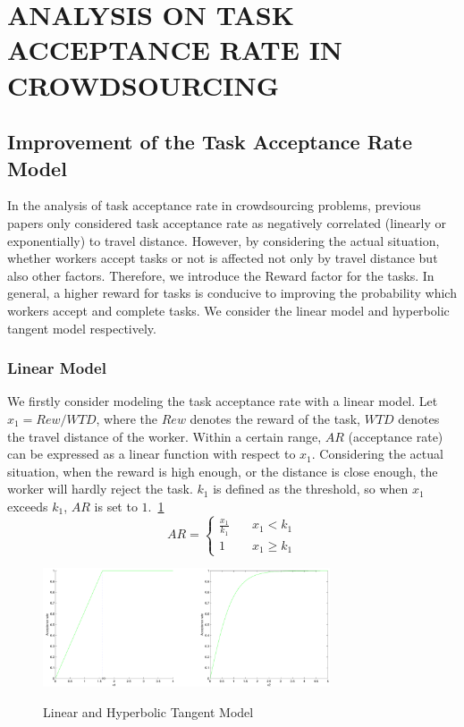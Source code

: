 \section{ANALYSIS ON TASK ACCEPTANCE RATE IN CROWDSOURCING}
\subsection{Improvement of the Task Acceptance Rate Model}
In the analysis of task acceptance rate in crowdsourcing problems, previous papers only considered task acceptance rate as negatively correlated (linearly or exponentially) to travel distance. However, by considering the actual situation, whether workers accept tasks or not is affected not only by travel distance but also other factors. Therefore, we introduce the Reward factor for the tasks. In general, a higher reward for tasks is conducive to improving the probability which workers accept and complete tasks. We consider the linear model and hyperbolic tangent model respectively.

\subsubsection{Linear Model}
We firstly consider modeling the task acceptance rate with a linear model. Let $x_1=Rew/WTD$, where the $Rew$ denotes the reward of the task, $WTD$ denotes the travel distance of the worker. Within a certain range, $AR$ (acceptance rate) can be expressed as a linear function with respect to $x_1$. Considering the actual situation, when the reward is high enough, or the distance is close enough, the worker will hardly reject the task. $k_1$ is defined as the threshold, so when $x_1$ exceeds $k_1$, $AR$ is set to $1$.~\ref{img:LinTanh}
$$
	AR= \left \{
	\begin{array}{cl}
	\frac{x_1}{k_1} \quad & \mbox{$x_1<k_1$} \\
	1 \quad & \mbox{$x_1 \geq k_1$}
	\end{array}
	\right.
$$

\begin{figure}
\includegraphics[width=8.5cm]{LinTanh}
\label{img:LinTanh}
\caption{Linear and Hyperbolic Tangent Model}
\end{figure}

